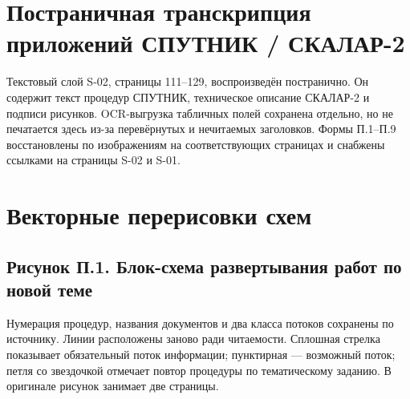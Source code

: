\documentclass[12pt,a4paper]{article}
\begin{document}
\begingroup
\footnotesize
{}
\endgroup

\section{Постраничная транскрипция приложений СПУТНИК / СКАЛАР-2}

Текстовый слой S-02, страницы 111--129, воспроизведён постранично. Он содержит текст процедур СПУТНИК, техническое описание СКАЛАР-2 и подписи рисунков. OCR-выгрузка табличных полей сохранена отдельно, но не печатается здесь из-за перевёрнутых и нечитаемых заголовков. Формы П.1--П.9 восстановлены по изображениям на соответствующих страницах и снабжены ссылками на страницы S-02 и S-01.

\begingroup
\footnotesize
{}
\endgroup

\section{Векторные перерисовки схем}

\subsection{Рисунок П.1. Блок-схема развертывания работ по новой теме}

Нумерация процедур, названия документов и два класса потоков сохранены по источнику. Линии расположены заново ради читаемости. Сплошная стрелка показывает обязательный поток информации; пунктирная — возможный поток; петля со звездочкой отмечает повтор процедуры по тематическому заданию. В оригинале рисунок занимает две страницы.
\end{document}
